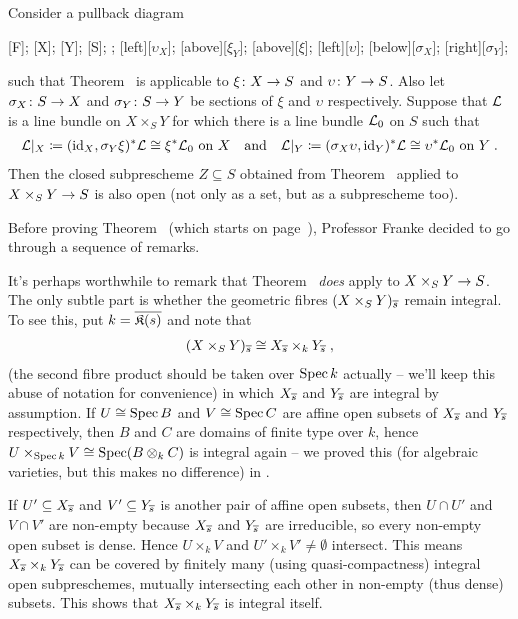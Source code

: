 \documentclass[a4paper,parskip=half,numbers=enddot, DIV=12]{scrreprt}
\begin{document}
\begin{thm}
	Consider a pullback diagram
	\begin{diagram*}
		[F];
		[X];
		[Y];
		[S];
		;
		\scriptsize
		[$\upsilon_X$];
		[above][$\xi_Y$];
		[above][$\xi$];
		[$\upsilon$];
		[below][$\sigma_X$];
		[right][$\sigma_Y$];
	\end{diagram*}
	 such that Theorem~ is applicable to $\xi\colon X\morphism S$ and $\upsilon\colon Y\morphism S$. Also let $\sigma_X\colon S\morphism X$ and $\sigma_Y\colon S\morphism Y$ be sections of $\xi$ and $\upsilon$ respectively. Suppose that $\mathcal{L}$ is a line bundle on $X\times_SY$ for which there is a line bundle $\mathcal{L}_0$ on $S$ such that
	 \begin{align*}
	 	\mathcal{L}|_X\coloneqq(\operatorname{id}_X,\sigma_Y\xi)^*\mathcal{L}\cong \xi^*\mathcal{L}_0\text{ on }X\quad\text{and}\quad\mathcal{L}|_Y\coloneqq(\sigma_X\upsilon,\operatorname{id}_Y)^*\mathcal{L}\cong \upsilon^*\mathcal{L}_0\text{ on }Y\;.
	 \end{align*}
	 Then the closed subprescheme $Z\subseteq S$ obtained from Theorem~ applied to $X\times_SY\morphism S$ is also open (not only as a set, but as a subprescheme too).
\end{thm}
Before proving Theorem~ (which starts on page~\pageref{proof:cube}), Professor Franke decided to go through a sequence of remarks.
\begin{rem}
	It's perhaps worthwhile to remark that Theorem~ \emph{does} apply to $X\times_SY\morphism S$. The only subtle part is whether the geometric fibres $(X\times_SY)_{\overline{s}}$ remain integral. To see this, put $k=\overline{\mathfrak{K}(s)}$ and note that
	\begin{align*}
		(X\times_SY)_{\overline{s}}\cong X_{\overline{s}}\times_kY_{\overline{s}}\;,
	\end{align*}
	(the second fibre product should be taken over $\operatorname{Spec} k$ actually -- we'll keep this abuse of notation for convenience) in which $X_{\overline{s}}$ and $Y_{\overline{s}}$ are integral by assumption. If $U\cong \operatorname{Spec} B$ and $V\cong \operatorname{Spec} C$ are affine open subsets of $X_{\overline{s}}$ and $Y_{\overline{s}}$ respectively, then $B$ and $C$ are domains of finite type over $k$, hence $U\times_{\operatorname{Spec} k}V\cong \operatorname{Spec} (B\otimes_kC)$ is integral again -- we proved this (for algebraic varieties, but this makes no difference) in \cite[Proposition~2.2.6]{alg1}.
	
	If $U'\subseteq X_{\overline{s}}$ and $V'\subseteq Y_{\overline{s}}$ is another pair of affine open subsets, then $U\cap U'$ and $V\cap V'$ are non-empty because $X_{\overline{s}}$ and $Y_{\overline{s}}$ are irreducible, so every non-empty open subset is dense. Hence $U\times_kV$ and $U'\times_kV'\neq \emptyset$ intersect. This means $X_{\overline{s}}\times_kY_{\overline{s}}$ can be covered by finitely many (using quasi-compactness) integral open subpreschemes, mutually intersecting each other in non-empty (thus dense) subsets. This shows that $X_{\overline{s}}\times_kY_{\overline{s}}$ is integral itself.
\end{rem}
\end{document}
